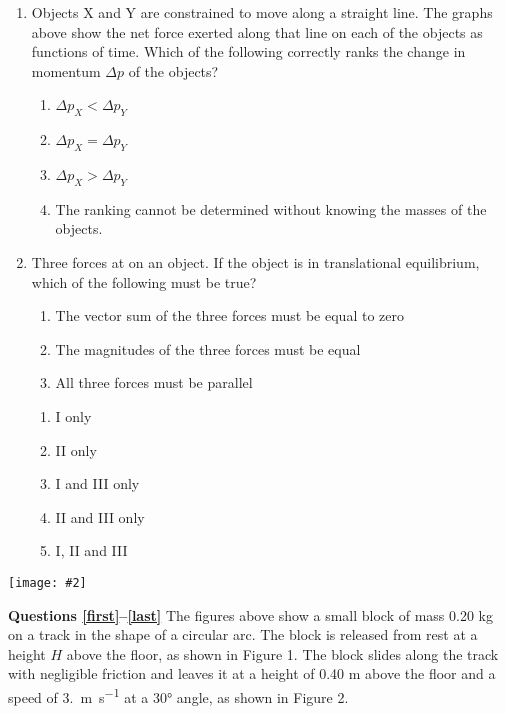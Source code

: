 \documentclass[11pt]{article}
\newcommand{\pic}[2]{\texttt{[image: \#2]}}
\begin{document}
\begin{multicols}{2}
\begin{enumerate}[leftmargin=18pt]
    \begin{center}
      \pic{.38}{impulses}
    \end{center}
  \item Objects X and Y are constrained to move along a straight line. The
    graphs above show the net force exerted along that line on each of the
    objects as functions of time. Which of the following correctly ranks the
    change in momentum $\Delta p$ of the objects?
    \begin{enumerate}[nosep,leftmargin=18pt,label=(\Alph*)]
    \item $\Delta p_X < \Delta p_Y$
    \item $\Delta p_X = \Delta p_Y$ 
    \item $\Delta p_X > \Delta p_Y$
    \item The ranking cannot be determined without knowing the masses of the
      objects.
    \end{enumerate}
    \vspace{.7in}
    \columnbreak
    
  \item Three forces at on an object. If the object is in translational
    equilibrium, which of the following must be true?
    \begin{enumerate}[nosep,leftmargin=18pt,label={\Roman*.}]
    \item The vector sum of the three forces must be equal to zero
    \item The magnitudes of the three forces must be equal
    \item All three forces must be parallel
    \end{enumerate}
    \begin{enumerate}[nosep,leftmargin=18pt,label=(\Alph*)]
    \item I only
    \item II only
    \item I and III only
    \item II and III only
    \item I, II and III
    \end{enumerate}
    \vspace{.7in}    
  \end{enumerate}
  
  \begin{center}
    \pic{.5}{circular-arc}
  \end{center}
  \textbf{Questions \ref{first}--\ref{last}} The figures above show a small
  block of mass 0.20 kg on a track in the shape of a circular arc. The block is
  released from rest at a height $H$ above the floor, as shown in Figure 1. The
  block slides along the track with negligible friction and leaves it at a
  height of 0.40 m above the floor and a speed of \SI{3.}{\metre\per\second} at
  a \ang{30} angle, as shown in Figure 2.


\end{multicols}
\end{document}

